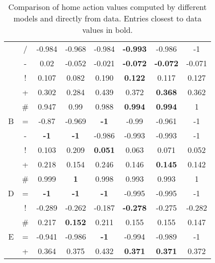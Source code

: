 \documentclass{sfuthesis}
\begin{document}
\begin{table}
\begin{tabular}{cc|ccccc|c}
			& {/}                & -0.984             & -0.968              & -0.984            &\textbf{ -0.993}         & -0.986             & -1            \\
			& -                & 0.02               & -0.052              & -0.021            &\textbf{ -0.072}         & \textbf{-0.072}             & -0.071        \\
			& !                & 0.107              & 0.082               & 0.190             & \textbf{0.122}          & 0.117              & 0.127         \\
			& +                & 0.302              & 0.284               & 0.439             & 0.372          & \textbf{0.368}              & 0.362         \\
			& \#               & 0.947              & 0.99                & 0.988             & \textbf{0.994}          & \textbf{0.994}              & 1             \\ \hline
			B              & =                & -0.87              & -0.969              & \textbf{-1}                & -0.99          & -0.961             & -1            \\
			& -                &\textbf{-1}                 & \textbf{-1}                  & -0.986            & -0.993         & -0.993             & -1            \\
			& !                & 0.103              & 0.209               & \textbf{0.051}             & 0.063          & 0.071              & 0.052         \\
			& +                & 0.218              & 0.154               & 0.246             & 0.146          & \textbf{0.145}              & 0.142         \\
			& \#               & 0.999              &\textbf{1}                   & 0.998             & 0.993          & 0.993              & 1             \\ \hline
			D              & =                &\textbf{ -1}                 &\textbf{ -1}                  & \textbf{-1}                & -0.995         & -0.995             & -1            \\
			& !                & -0.289             & -0.262              & -0.187            & \textbf{-0.278}         & -0.275             & -0.282        \\
			& \#               & 0.217              & \textbf{0.152}               & 0.211             & 0.155          & 0.155              & 0.147         \\ \hline
			E              & =                & -0.941             & -0.986              & \textbf{-1}                & -0.994         & -0.989             & -1            \\
			& +                & 0.364              & 0.375               & 0.432             & \textbf{0.371}          & \textbf{0.371}              & 0.372        
		\end{tabular}
		\caption{Comparison of home action values computed by different models and directly from data. Entries closest to data values in bold.}
		\label{tab:qvalues_home}
	\end{table}
	
\end{document}
